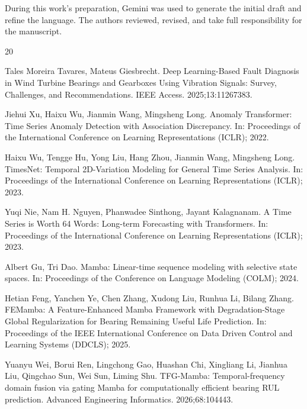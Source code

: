 \documentclass[runningheads]{llncs}
\begin{document}
During this work's preparation, Gemini was used to generate the initial draft and refine the language. The authors reviewed, revised, and take full responsibility for the manuscript.
%
%
%
% 
% 
%
\begin{thebibliography}{20}
\setlength{\itemsep}{2pt}

Tales Moreira Tavares, Mateus Giesbrecht. Deep Learning-Based Fault Diagnosis in Wind Turbine Bearings and Gearboxes Using Vibration Signals: Survey, Challenges, and Recommendations. IEEE Access. 2025;13:11267383. 

Jiehui Xu, Haixu Wu, Jianmin Wang, Mingsheng Long. Anomaly Transformer: Time Series Anomaly Detection with Association Discrepancy. In: Proceedings of the International Conference on Learning Representations (ICLR); 2022. 

Haixu Wu, Tengge Hu, Yong Liu, Hang Zhou, Jianmin Wang, Mingsheng Long. TimesNet: Temporal 2D-Variation Modeling for General Time Series Analysis. In: Proceedings of the International Conference on Learning Representations (ICLR); 2023. 

Yuqi Nie, Nam H. Nguyen, Phanwadee Sinthong, Jayant Kalagnanam. A Time Series is Worth 64 Words: Long-term Forecasting with Transformers. In: Proceedings of the International Conference on Learning Representations (ICLR); 2023. 

Albert Gu, Tri Dao. Mamba: Linear-time sequence modeling with selective state spaces. In: Proceedings of the Conference on Language Modeling (COLM); 2024. 

Hetian Feng, Yanchen Ye, Chen Zhang, Xudong Liu, Runhua Li, Bilang Zhang. FEMamba: A Feature-Enhanced Mamba Framework with Degradation-Stage Global Regularization for Bearing Remaining Useful Life Prediction. In: Proceedings of the IEEE International Conference on Data Driven Control and Learning Systems (DDCLS); 2025. 

Yuanyu Wei, Borui Ren, Lingchong Gao, Huashan Chi, Xingliang Li, Jianhua Liu, Qingchao Sun, Wei Sun, Liming Shu. TFG-Mamba: Temporal-frequency domain fusion via gating Mamba for computationally efficient bearing RUL prediction. Advanced Engineering Informatics. 2026;68:104443. 


\end{thebibliography}
\end{document}
